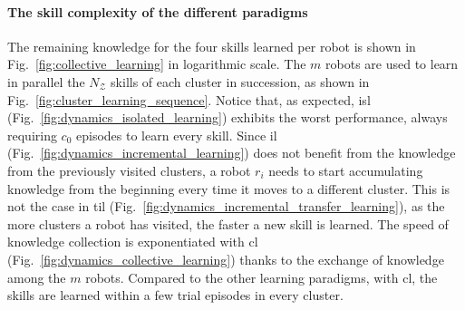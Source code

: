 \documentclass[12pt]{article}
\begin{document}
\paragraph*{The skill complexity of the different paradigms}
The remaining knowledge for the four skills learned per robot is shown in Fig.~\ref{fig:collective_learning} in logarithmic scale. The $m$ robots are used to learn in parallel the $N_\mathcal{Z}$ skills of each cluster in succession, as shown in Fig.~\ref{fig:cluster_learning_sequence}. Notice that, as expected, \ac{isl} (Fig.~\ref{fig:dynamics_isolated_learning}) exhibits the worst performance, always requiring $c_0$ episodes to learn every skill. Since \ac{il} (Fig.~\ref{fig:dynamics_incremental_learning}) does not benefit from the knowledge from the previously visited clusters, a robot $r_i$ needs to start accumulating knowledge from the beginning every time it moves to a different cluster. This is not the case in \ac{til} (Fig.~\ref{fig:dynamics_incremental_transfer_learning}), as the more clusters a robot has visited, the faster a new skill is learned. The speed of knowledge collection is exponentiated with \ac{cl} (Fig.~\ref{fig:dynamics_collective_learning}) thanks to the exchange of knowledge among the $m$ robots. Compared to the other learning paradigms, with \ac{cl}, the skills are learned within a few trial episodes in every cluster. 
\end{document}
